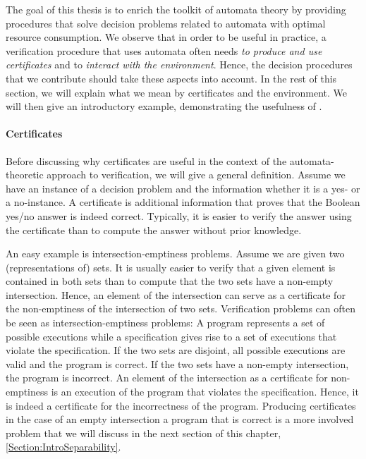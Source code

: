 \documentclass[../../diss.tex]{subfiles}
\begin{document}
The goal of this thesis is to enrich the toolkit of automata theory by providing procedures that solve decision problems related to automata with optimal resource consumption.
We observe that in order to be useful in practice, a verification procedure that uses automata often needs \emph{to produce and use certificates} and to \emph{interact with the environment}.
Hence, the decision procedures that we contribute should take these aspects into account.
In the rest of this section, we will explain what we mean by certificates and the environment.
We will then give an introductory example, demonstrating the usefulness of .


\paragraph{Certificates}

Before discussing why certificates are useful in the context of the automata-theoretic approach to verification, we will give a general definition.
Assume we have an instance of a decision problem and the information whether it is a yes- or a no-instance.
A certificate is additional information that proves that the Boolean yes/no answer is indeed correct.
Typically, it is easier to verify the answer using the certificate than to compute the answer without prior knowledge.

An easy example is intersection-emptiness problems.
Assume we are given two (representations of) sets.
It is usually easier to verify that a given element is contained in both sets than to compute that the two sets have a non-empty intersection.
Hence, an element of the intersection can serve as a certificate for the non-emptiness of the intersection of two sets.
Verification problems can often be seen as intersection-emptiness problems:
A program represents a set of possible executions while a specification gives rise to a set of executions that violate the specification.
If the two sets are disjoint, all possible executions are valid and the program is correct.
If the two sets have a non-empty intersection, the program is incorrect.
An element of the intersection as a certificate for non-emptiness is an execution of the program that violates the specification.
Hence, it is indeed a certificate for the incorrectness of the program.
Producing certificates in the case of an empty intersection \resp a program that is correct is a more involved problem that we will discuss in the next section of this chapter, \cref{Section:IntroSeparability}.
\end{document}
